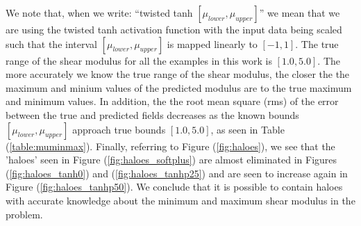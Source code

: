 \documentclass[12pt]{article}
\begin{document}
We note that, when we write: ``twisted tanh $[\mu_{lower},\mu_{upper}]$'' we mean that we are using the twisted tanh activation function with the input data being scaled such that the interval $[\mu_{lower},\mu_{upper}]$ is mapped linearly to $[-1,1]$. The true range of the shear modulus for all the examples in this work is $[1.0,5.0]$. The more accurately we know the true range of the shear modulus, the closer the the maximum and minium values of the predicted modulus are to the true maximum and minimum values. In addition, the the root mean square (rms) of the error between the true and predicted fields decreases as the known bounds $[\mu_{lower},\mu_{upper}]$ approach true bounds $[1.0,5.0]$, as seen in Table (\ref{table:muminmax}). Finally, referring to Figure (\ref{fig:haloes}), we see that the 'haloes' seen in Figure (\ref{fig:haloes_softplus}) are almost eliminated in Figures (\ref{fig:haloes_tanh0}) and (\ref{fig:haloes_tanhp25}) and are seen to increase again in Figure (\ref{fig:haloes_tanhp50}). We conclude that it is possible to contain haloes with accurate knowledge about the minimum and maximum shear modulus in the problem.
\end{document}
